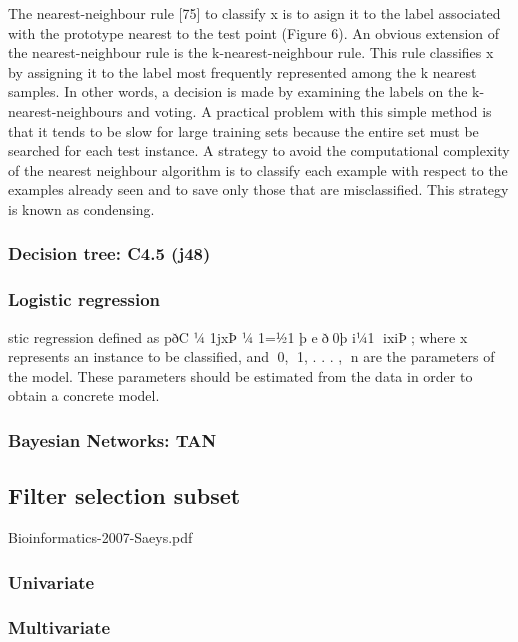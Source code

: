 \documentclass[conference,a4paper]{IEEEtran}
\begin{document}
The nearest-neighbour rule [75] to classify x is to asign it to the label associated with the prototype nearest to the test point (Figure 6). An obvious extension of the nearest-neighbour rule is the k-nearest-neighbour rule. This rule classifies x by assigning it to the label most frequently represented among the k nearest samples. In other words, a decision is made by examining the labels on the k-nearest-neighbours and voting.
A practical problem with this simple method is that it tends to be slow for large training sets because the entire set must be searched for each test instance. A strategy to avoid the computational complexity of the nearest neighbour algorithm is to classify each example with respect to the examples already seen and to save only those that are misclassified. This strategy is known as condensing.

\subsubsection{Decision tree: C4.5 (j48)}



\subsubsection{Logistic regression}

stic regression
defined as pðC 1⁄4 1jxÞ 1⁄4 1=1⁄21 þ e􏰁ð􏰉0þ i1⁄41 􏰉ixiÞ􏰄; where x represents an instance to be classified, and 􏰉0, 􏰉1, . . . , 􏰉n are the parameters of the model. These parameters should be estimated from the data in order to obtain a concrete model.

\subsubsection{Bayesian Networks: TAN}

\subsection{Filter selection subset}

Bioinformatics-2007-Saeys.pdf

\subsubsection{Univariate}

\subsubsection{Multivariate}
\end{document}
